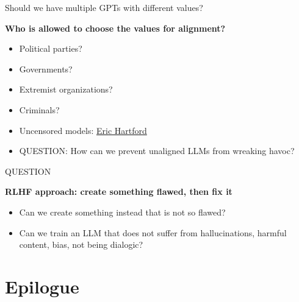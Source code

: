 \begin{vbframe}{Should we have multiple GPTs with different values?}

\vfill

\textbf{Who is allowed to choose the values for alignment?}

	\begin{itemize}
		\item Political parties?
		\item Governments?
		\item Extremist organizations?
                \item Criminals?
                \item Uncensored models:
                \href{https://erichartford.com}{Eric Hartford}
                \item QUESTION: How can we prevent unaligned
		LLMs from wreaking havoc?
	\end{itemize}

\vfill

\end{vbframe}



\begin{vbframe}{QUESTION}

\vfill

\textbf{RLHF approach: create something flawed, then fix it}

	\begin{itemize}
		\item Can we create something instead that
		is not so flawed?
                \item Can we train an LLM that does not
		suffer from hallucinations, harmful content,
		bias, not being dialogic?
	\end{itemize}

\vfill

\end{vbframe}










\section{Epilogue}





